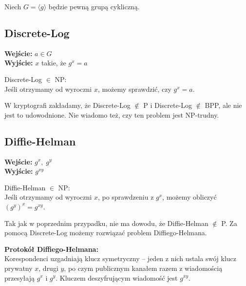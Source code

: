 Niech \( G = \langle g \rangle \) będzie pewną grupą cykliczną.

\subsection{Discrete-Log}
\textbf{Wejście:} \( a \in G \) \\
\textbf{Wyjście:} \( x \) takie, że \( g^x = a \)

Discrete-Log \( \in \) NP: \\
Jeśli otrzymamy od wyroczni \( x \), możemy sprawdzić, czy \( g^x = a \).

W kryptografi zakładamy, że Discrete-Log \( \notin \) P i Discrete-Log \( \notin \) BPP, ale nie jest to udowodnione. Nie wiadomo też, czy ten problem jest NP-trudny.

\subsection{Diffie-Helman}
\textbf{Wejście:} \( g^x,\; g^y \) \\
\textbf{Wyjście:} \( g^{xy} \)

Diffie-Helman \( \in \) NP: \\
Jeśli otrzymamy od wyroczni \( x \), po sprawdzeniu z \( g^x \), możemy obliczyć \( (g^{y})^x = g^{xy} \).

Tak jak w poprzednim przypadku, nie ma dowodu, że Diffie-Helman \( \notin \) P. Za pomocą Discrete-Log możemy rozwiązać problem Diffiego-Helmana.

\textbf{Protokół Diffiego-Helmana:} \\
Korespondenci uzgadniają klucz symetryczny -- jeden z nich ustala swój klucz prywatny \( x \), drugi \( y \), po czym publicznym kanałem razem z wiadomością przesyłają \( g^x \) i \( g^y \). Kluczem deszyfrującym wiadomość jest \( g^{xy} \).
